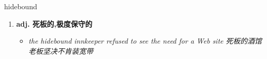 
\begin{frame}
{\huge hidebound}
\begin{center}
\begin{enumerate}\Large
  \item \textbf{adj. 死板的,极度保守的}
  \begin{itemize}
    \item \em{\Large{the hidebound innkeeper refused to see the need for a Web site 死板的酒馆老板坚决不肯装宽带}}
  \end{itemize}
\end{enumerate}
\end{center}
\end{frame}
